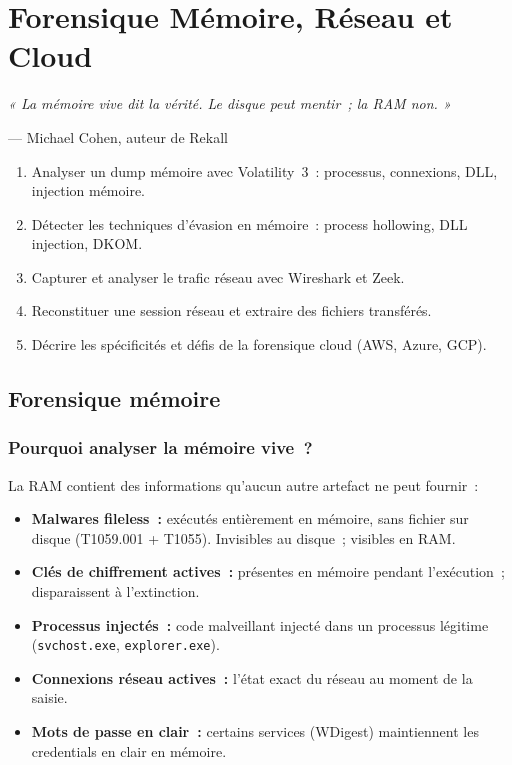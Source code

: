 \chapter{Forensique Mémoire, Réseau et Cloud}
\label{chap:forensics-mem-net}

\epigraph{\itshape « La mémoire vive dit la vérité.
  Le disque peut mentir~; la RAM non. »}
         {--- Michael Cohen, auteur de Rekall}

\begin{boxobjectifs}
\begin{enumerate}
  \item Analyser un dump mémoire avec Volatility~3~: processus, connexions,
        DLL, injection mémoire.
  \item Détecter les techniques d'évasion en mémoire~: process hollowing,
        DLL injection, DKOM.
  \item Capturer et analyser le trafic réseau avec Wireshark et Zeek.
  \item Reconstituer une session réseau et extraire des fichiers transférés.
  \item Décrire les spécificités et défis de la forensique cloud (AWS,
        Azure, GCP).
\end{enumerate}
\end{boxobjectifs}

\section{Forensique mémoire}
\label{sec:forensics-ram}

\subsection{Pourquoi analyser la mémoire vive~?}

La RAM contient des informations qu'aucun autre artefact ne peut fournir~:
\begin{itemize}
  \item \textbf{Malwares fileless~:} exécutés entièrement en mémoire,
        sans fichier sur disque (T1059.001 + T1055). Invisibles au disque~;
        visibles en RAM.
  \item \textbf{Clés de chiffrement actives~:} présentes en mémoire
        pendant l'exécution~; disparaissent à l'extinction.
  \item \textbf{Processus injectés~:} code malveillant injecté dans un
        processus légitime (\texttt{svchost.exe}, \texttt{explorer.exe}).
  \item \textbf{Connexions réseau actives~:} l'état exact du réseau
        au moment de la saisie.
  \item \textbf{Mots de passe en clair~:} certains services (WDigest)
        maintiennent les credentials en clair en mémoire.
\end{itemize}

